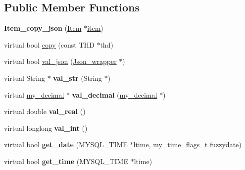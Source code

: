 \subsection*{Public Member Functions}
\begin{DoxyCompactItemize}
\item 
\mbox{\label{classItem__copy__json_ad6119954b9cc3b47ca7420eaa30664ad}} 
{\bfseries Item\+\_\+copy\+\_\+json} (\mbox{\hyperlink{classItem}{Item}} $\ast$\mbox{\hyperlink{classItem__copy_a9ef1b9fd547a3b940e89e9837083c87f}{item}})
\item 
virtual bool \mbox{\hyperlink{classItem__copy__json_a061528b6d05583ba76ecec780d4603f7}{copy}} (const T\+HD $\ast$thd)
\item 
virtual bool \mbox{\hyperlink{classItem__copy__json_aead579100651419c06fe93f2e53bb396}{val\+\_\+json}} (\mbox{\hyperlink{classJson__wrapper}{Json\+\_\+wrapper}} $\ast$)
\item 
\mbox{\label{classItem__copy__json_a4f84f1cd4290884a562ceb59adbe7eb2}} 
virtual String $\ast$ {\bfseries val\+\_\+str} (String $\ast$)
\item 
\mbox{\label{classItem__copy__json_a2cb394a08f083590f164dbc57bbf3087}} 
virtual \mbox{\hyperlink{classmy__decimal}{my\+\_\+decimal}} $\ast$ {\bfseries val\+\_\+decimal} (\mbox{\hyperlink{classmy__decimal}{my\+\_\+decimal}} $\ast$)
\item 
\mbox{\label{classItem__copy__json_a4f32888285513a91fa67f5cd1f986957}} 
virtual double {\bfseries val\+\_\+real} ()
\item 
\mbox{\label{classItem__copy__json_a9728665aa46804f0f6c1010660e08e3c}} 
virtual longlong {\bfseries val\+\_\+int} ()
\item 
\mbox{\label{classItem__copy__json_ab15e45d98dee553cd4f2ee8e3969e651}} 
virtual bool {\bfseries get\+\_\+date} (M\+Y\+S\+Q\+L\+\_\+\+T\+I\+ME $\ast$ltime, my\+\_\+time\+\_\+flags\+\_\+t fuzzydate)
\item 
\mbox{\label{classItem__copy__json_ab9831e4017886e4a61c7c73e0898b5bb}} 
virtual bool {\bfseries get\+\_\+time} (M\+Y\+S\+Q\+L\+\_\+\+T\+I\+ME $\ast$ltime)
\end{DoxyCompactItemize}
